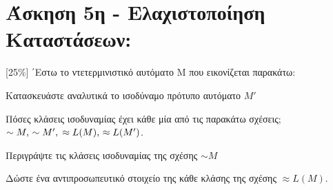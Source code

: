 \section{Άσκηση 5η - Ελαχιστοποίηση Καταστάσεων:}
\label{sec:Exercise_5}
\doublespacing

[25\%]  ΄Εστω το ντετερμινιστικό αυτόματο M που εικονίζεται παρακάτω:

\bm{\textcolor{blue}{(α)}}  Κατασκευάστε αναλυτικά το ισοδύναμο πρότυπο αυτόματο $M'$

\bm{\textcolor{blue}{(β)}} Πόσες κλάσεις ισοδυναμίας έχει κάθε μία από τις παρακάτω σχέσεις; $\sim M,\, \sim M',\\
\approx{L}(M),\, \approx{L}(M')$.

\bm{\textcolor{blue}{(γ)}} Περιγράψτε τις κλάσεις ισοδυναμίας της σχέσης $\sim M$

\bm{\textcolor{blue}{(δ)}} Δώστε ένα αντιπροσωπευτικό στοιχείο της κάθε κλάσης της σχέσης $\approx{L}(M)$.

\hfill \break

